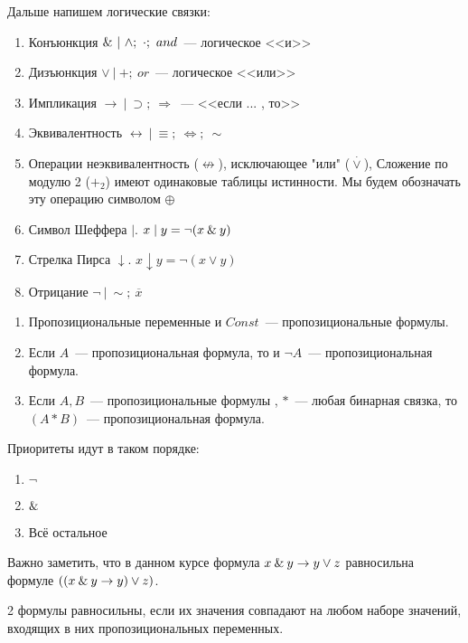 \documentclass[main]{subfiles}
\begin{document}
Дальше напишем логические связки:
\begin{enumerate}
    \item Конъюнкция $\and\ |\ \land;\ \cdot;\ and $~--- логическое <<и>>
    \item Дизъюнкция $\lor\ |\ +;\ or$~---  логическое <<или>>
    \item Импликация $\to\ |\ \supset;\ \Rightarrow$~--- <<если ... , то>>
    \item Эквивалентность $\leftrightarrow\ |\ \equiv;\ \Leftrightarrow;\ \sim$
    \item Операции неэквивалентность ($\not\leftrightarrow$), исключающее "или" ($\stackrel{\cdot}{\lor}$), Сложение по модулю 2 ($+_2$) имеют одинаковые таблицы истинности. Мы будем обозначать эту операцию символом $\oplus$
    \item Символ Шеффера $ \mid$.   $x\mid y = \lnot(x\mathbin{\&} y)$
    \item Стрелка Пирса $\downarrow$.   $x\downarrow y = \lnot(x\lor y)$
    \item Отрицание $\lnot\ |\ \sim;\ \overline{x}$
\end{enumerate}
\begin{definition}
    \begin{enumerate}
        \item Пропозициональные переменные и $Const$~---
              пропозициональные формулы.
        \item Если $A$~--- пропозициональная
              формула, то и $\lnot A$~--- пропозициональная формула.
        \item Если $A, B$~--- пропозициональные формулы , $*$~--- любая бинарная
              связка, то $(A * B)$~--- пропозициональная формула.
    \end{enumerate}
\end{definition}
Приоритеты идут в таком порядке:
\begin{enumerate}
    \item $\lnot$
    \item $\mathbin{\&}$
    \item Всё остальное
\end{enumerate}
\begin{remark}
    Важно заметить, что в данном курсе формула $x\mathbin{\&} y \to y\lor z$ равносильна формуле $((x\mathbin{\&} y \to y) \lor z)$.
\end{remark}
\begin{definition}
    2 формулы равносильны, если их значения совпадают на любом наборе значений,
    входящих в них пропозициональных переменных.
\end{definition}
\end{document}
